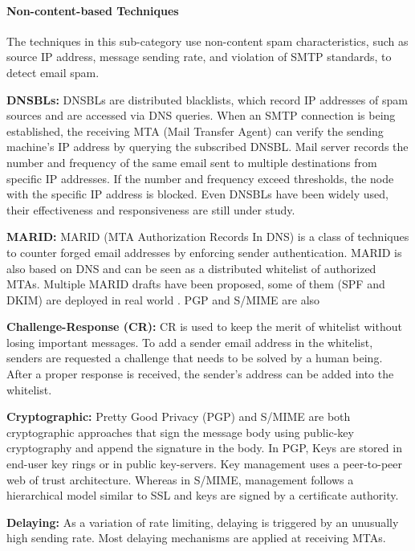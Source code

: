 \paragraph{Non-content-based Techniques}
The techniques in this sub-category use non-content spam characteristics,
	such as source IP address,
	message sending rate,
	and violation of SMTP standards,
	to detect email spam.

\textbf{DNSBLs:} DNSBLs are distributed blacklists,
	which record IP addresses of spam sources and are accessed via DNS queries.
When an SMTP connection is being established,
	the receiving MTA (Mail Transfer Agent) can verify the sending machine’s IP address by querying the subscribed DNSBL.
Mail server records the number and frequency of the same email sent to multiple destinations from specific IP addresses.
If the number and frequency exceed thresholds,
	the node with the specific IP address is blocked.
Even DNSBLs have been widely used,
	their effectiveness and responsiveness \cite{jung_empirical_2004, ramachandran_can_2006} are still under study.

\textbf{MARID:} MARID (MTA Authorization Records In DNS) is a class of techniques to counter forged email addresses by enforcing sender authentication.
MARID is also based on DNS and can be seen as a distributed whitelist of authorized MTAs.
Multiple MARID drafts have been proposed,
	some of them (SPF and DKIM) are deployed in real world \cite{spf:_2018, BibEntry2014Dec}.
	PGP and S/MIME are also

\textbf{Challenge-Response (CR):} CR is used to keep the merit of whitelist without losing important messages.
To add a sender email address in the whitelist,
	senders are requested a challenge that needs to be solved by a human being.
After a proper response is received,
	the sender’s address can be added into the whitelist.

\textbf{Cryptographic:}
Pretty Good Privacy (PGP) \cite{pgpaghiles2007} and S/MIME are both cryptographic approaches that sign the message body using public-key cryptography and append the signature in the body.
In PGP,
	Keys are stored in end-user key rings or in public key-servers.
Key management uses a peer-to-peer web of trust architecture.
Whereas in S/MIME,
	management follows a hierarchical model similar to SSL and keys are signed by a certificate authority.

\textbf{Delaying:} As a variation of rate limiting,
	delaying is triggered by an unusually high sending rate.
Most delaying mechanisms are applied at receiving MTAs.

